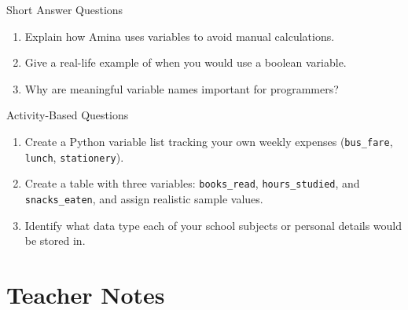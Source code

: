 \begin{exercise}{Short Answer Questions}
\begin{enumerate}
    \item Explain how Amina uses variables to avoid manual calculations.
    \item Give a real-life example of when you would use a boolean variable.
    \item Why are meaningful variable names important for programmers?
\end{enumerate}
\end{exercise}

\begin{exercise}{Activity-Based Questions}
\begin{enumerate}
    \item Create a Python variable list tracking your own weekly expenses (\texttt{bus\_fare}, \texttt{lunch}, \texttt{stationery}).
    \item Create a table with three variables: \texttt{books\_read}, \texttt{hours_studied}, and \texttt{snacks\_eaten}, and assign realistic sample values.
    \item Identify what data type each of your school subjects or personal details would be stored in.
\end{enumerate}
\end{exercise}

\section{Teacher Notes}

